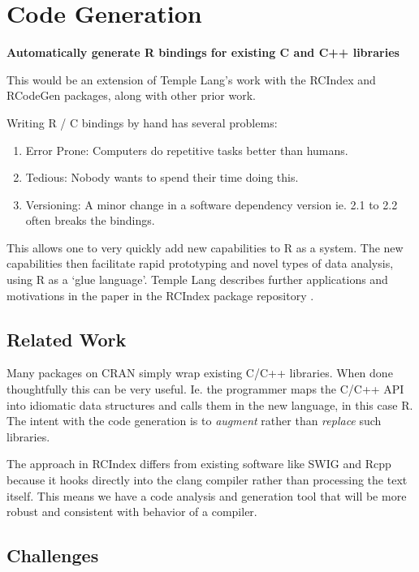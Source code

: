 \documentclass[12pt]{article}
\begin{document}
\section{Code Generation}

\textbf{Automatically generate R bindings for existing C and C++ libraries}

This would be an extension of Temple Lang's
work with the RCIndex \cite{R-RCIndex} and RCodeGen \cite{R-RCodegen}
packages, along with other prior work.

Writing R / C bindings by hand has several problems: 
\begin{enumerate}
    \item{Error Prone:} Computers do repetitive tasks better than humans.
    \item{Tedious:} Nobody wants to spend their time doing this.
    \item{Versioning:} A minor change in a software dependency version ie. 2.1
        to 2.2 often breaks the bindings.
\end{enumerate}

This allows one to very quickly add new
capabilities to R as a system. The new capabilities then facilitate rapid
prototyping and novel types of data analysis, using R as a `glue language'.
Temple Lang describes further applications and motivations in the paper in
the RCIndex package repository \cite{R-RCIndex}.

\subsection{Related Work}

Many packages on CRAN simply wrap existing C/C++ libraries. When done
thoughtfully this can be very useful. Ie. the programmer maps the C/C++ API
into idiomatic data structures and calls them in the new language, in this
case R.  The intent with the code generation is to \emph{augment} rather
than \emph{replace} such libraries. 

The approach in RCIndex differs from existing software like SWIG
\cite{swig} and Rcpp \cite{R-Rcpp} because it hooks directly into the clang
compiler rather than processing the text itself. This means we have a code
analysis and generation tool that will be more robust and consistent with
behavior of a compiler. 

\subsection{Challenges}
\end{document}
